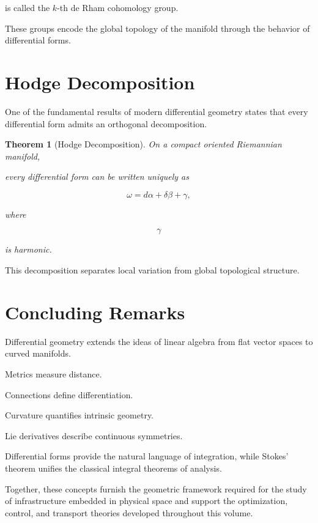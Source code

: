 \documentclass[11pt,fleqn]{book}
\numberwithin{equation}{chapter}
\theoremstyle{plain}
\newtheorem{theorem}{Theorem}[chapter]
\theoremstyle{definition}
\theoremstyle{remark}
\begin{document}
is called the \(k\)-th de Rham cohomology group.

These groups encode the global topology of the manifold through the
behavior of differential forms.


\section{Hodge Decomposition}

One of the fundamental results of modern differential geometry states
that every differential form admits an orthogonal decomposition.

\begin{theorem}[Hodge Decomposition]

On a compact oriented Riemannian manifold,

every differential form can be written uniquely as

\[
\boxed{
\omega
=
d\alpha
+
\delta\beta
+
\gamma,
}
\]

where

\[
\gamma
\]

is harmonic.

\end{theorem}

This decomposition separates local variation from global topological
structure.


\section{Concluding Remarks}

Differential geometry extends the ideas of linear algebra from flat
vector spaces to curved manifolds.

Metrics measure distance.

Connections define differentiation.

Curvature quantifies intrinsic geometry.

Lie derivatives describe continuous symmetries.

Differential forms provide the natural language of integration, while
Stokes' theorem unifies the classical integral theorems of analysis.

Together, these concepts furnish the geometric framework required for
the study of infrastructure embedded in physical space and support the
optimization, control, and transport theories developed throughout this
volume.
\end{document}
